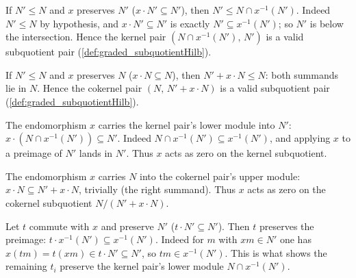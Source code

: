 \begin{lemma}
  \label{lem:graded_ker_le}
  If \(N' \le N\) and \(x\) preserves \(N'\) (\(x \cdot N' \subseteq N'\)), then
  \(N' \le N \cap x^{-1}(N')\). Indeed \(N' \le N\) by hypothesis, and \(x \cdot N'
  \subseteq N'\) is exactly \(N' \subseteq x^{-1}(N')\); so \(N'\) is below the
  intersection. Hence the kernel pair \((N \cap x^{-1}(N'),\, N')\) is a valid
  subquotient pair (\cref{def:graded_subquotientHilb}).
\end{lemma}

\begin{lemma}
  \label{lem:graded_coker_le}
  If \(N' \le N\) and \(x\) preserves \(N\) (\(x \cdot N \subseteq N\)), then
  \(N' + x \cdot N \le N\): both summands lie in \(N\). Hence the cokernel pair
  \((N,\, N' + x \cdot N)\) is a valid subquotient pair
  (\cref{def:graded_subquotientHilb}).
\end{lemma}

\begin{lemma}
  \label{lem:graded_ker_annihilate}
  The endomorphism \(x\) carries the kernel pair's lower module into \(N'\):
  \(x \cdot (N \cap x^{-1}(N')) \subseteq N'\). Indeed \(N \cap x^{-1}(N') \subseteq
  x^{-1}(N')\), and applying \(x\) to a preimage of \(N'\) lands in \(N'\). Thus \(x\)
  acts as zero on the kernel subquotient.
\end{lemma}

\begin{lemma}
  \label{lem:graded_coker_annihilate}
  The endomorphism \(x\) carries \(N\) into the cokernel pair's upper module:
  \(x \cdot N \subseteq N' + x \cdot N\), trivially (the right summand). Thus \(x\)
  acts as zero on the cokernel subquotient \(N/(N' + x \cdot N)\).
\end{lemma}

\begin{lemma}
  \label{lem:graded_comap_map_le_of_commute}
  Let \(t\) commute with \(x\) and preserve \(N'\) (\(t \cdot N' \subseteq N'\)). Then
  \(t\) preserves the preimage: \(t \cdot x^{-1}(N') \subseteq x^{-1}(N')\). Indeed for
  \(m\) with \(x m \in N'\) one has \(x(t m) = t(x m) \in t \cdot N' \subseteq N'\), so
  \(t m \in x^{-1}(N')\). This is what shows the remaining \(t_i\) preserve the kernel
  pair's lower module \(N \cap x^{-1}(N')\).
\end{lemma}

